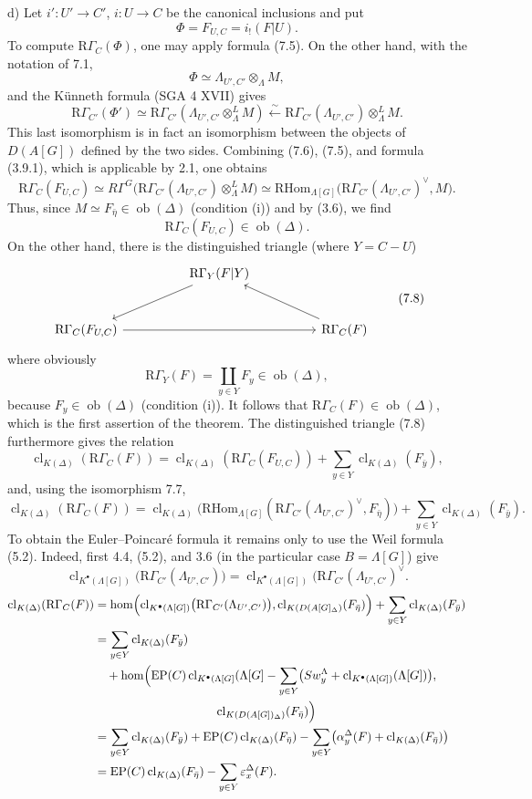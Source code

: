 \documentclass[11pt]{article}
\providecommand{\RHom}{\mathrm{RHom}}
\providecommand{\cl}{\operatorname{cl}}
\providecommand{\EP}{\operatorname{EP}}
\providecommand{\Ob}{\operatorname{ob}}
\providecommand{\RHom}{\mathrm{RHom}}
\providecommand{\RHom}{\mathrm R\mathcal{H}om}
\providecommand{\Ob}{\operatorname{ob}}
\providecommand{\cl}{\operatorname{cl}}
\providecommand{\EP}{\operatorname{EP}}
\providecommand{\Ob}{\operatorname{Ob}}
\providecommand{\clK}[1]{\operatorname{cl}_{K(#1)}}
\providecommand{\clKstar}[1]{\operatorname{cl}_{K^{\bullet}(#1)}}
\providecommand{\RG}{\mathrm R\Gamma}
\providecommand{\RHom}{\mathrm{RHom}}
\providecommand{\cl}{\operatorname{cl}}
\providecommand{\Ob}{\operatorname{ob}}
\providecommand{\Ob}{\operatorname{Ob}}
\begin{document}
d) Let $i':U'\to C'$, $i:U\to C$ be the canonical inclusions and put
\[
\Phi=F_{U,C}=i_!(F|U).
\]
To compute $\RG_C(\Phi)$, one may apply formula (7.5). On the other hand, with the notation of 7.1,
\[
\Phi\simeq \Lambda_{U',C'}\otimes_\Lambda M,
\]
and the Künneth formula (SGA 4 XVII) gives
\[
\RG_{C'}(\Phi')
\simeq
\RG_{C'}(\Lambda_{U',C'}\otimes_\Lambda^L M)
\xleftarrow{\sim}
\RG_{C'}(\Lambda_{U',C'})\otimes_\Lambda^L M.
\tag{7.6}
\]
This last isomorphism is in fact an isomorphism between the objects of $D(A[G])$ defined by the two sides. Combining (7.6), (7.5), and formula (3.9.1), which is applicable by 2.1, one obtains
\[
\RG_C(F_{U,C})
\simeq
R\Gamma^G\bigl(\RG_{C'}(\Lambda_{U',C'})\otimes_\Lambda^L M\bigr)
\simeq
\RHom_{\Lambda[G]}\bigl(\RG_{C'}(\Lambda_{U',C'})^\vee,M\bigr).
\tag{7.7}
\]
Thus, since $M\simeq F_{\bar\eta}\in\Ob(\Delta)$ (condition (i)) and by (3.6), we find
\[
\RG_C(F_{U,C})\in\Ob(\Delta).
\]
On the other hand, there is the distinguished triangle (where $Y=C-U$)
\[
\begin{tikzcd}[column sep=huge,row sep=large]
& \RG_Y(F|Y) \arrow[dl] & \\
\RG_C(F_{U,C}) \arrow[rr] && \RG_C(F) \arrow[ul]
\end{tikzcd}
\tag{7.8}
\]
where obviously
\[
\RG_Y(F)=\coprod_{y\in Y}F_y\in\Ob(\Delta),
\]
because $F_y\in\Ob(\Delta)$ (condition (i)). It follows that $\RG_C(F)\in\Ob(\Delta)$, which is the first assertion of the theorem. The distinguished triangle (7.8) furthermore gives the relation
\[
\clK{\Delta}(\RG_C(F))
=
\clK{\Delta}(\RG_C(F_{U,C}))
+\sum_{y\in Y}\clK{\Delta}(F_{\bar y}),
\]
and, using the isomorphism 7.7,
\[
\clK{\Delta}(\RG_C(F))
=
\clK{\Delta}\bigl(\RHom_{\Lambda[G]}(\RG_{C'}(\Lambda_{U',C'})^\vee,F_{\bar\eta})\bigr)
+\sum_{y\in Y}\clK{\Delta}(F_{\bar y}).
\]
To obtain the Euler--Poincaré formula it remains only to use the Weil formula (5.2). Indeed, first 4.4, (5.2), and 3.6 (in the particular case $B=\Lambda[G]$) give
\[
\clKstar{\Lambda[G]}\bigl(\RG_{C'}(\Lambda_{U',C'})\bigr)
=
\clKstar{\Lambda[G]}\bigl(\RG_{C'}(\Lambda_{U',C'})^\vee\bigr.
\]
\[
\begin{aligned}
\clK{\Delta}(\RG_C(F))
&=\operatorname{hom}\Bigl(
\clKstar{\Lambda[G]}\bigl(\RG_{C'}(\Lambda_{U',C'})\bigr),
\cl_{K(D(A[G]_\Delta)}(F_{\bar\eta})\Bigr)
 +\sum_{y\in Y}\clK{\Delta}(F_{\bar y})\\
&=\sum_{y\in Y}\clK{\Delta}(F_{\bar y})\\
&\quad +\operatorname{hom}\Bigl(
\EP(C)\operatorname{cl}_{K^{\bullet}(\Lambda[G]}(\Lambda[G]
 -\sum_{y\in Y}\bigl(Sw_y^{\Lambda}+\clKstar{\Lambda[G]}(\Lambda[G])\bigr),\\
&\hspace{10em}\cl_{K(D(A[G])_\Delta)}(F_{\bar\eta})\Bigr)\\
&=\sum_{y\in Y}\clK{\Delta}(F_{\bar y})
 +\EP(C)\clK{\Delta}(F_{\bar\eta})
 -\sum_{y\in Y}\bigl(\alpha_y^\Delta(F)+\clK{\Delta}(F_{\bar\eta})\bigr)\\
&=\EP(C)\clK{\Delta}(F_{\bar\eta})
 -\sum_{y\in Y}\varepsilon_x^\Delta(F).
\end{aligned}
\]
\end{document}
